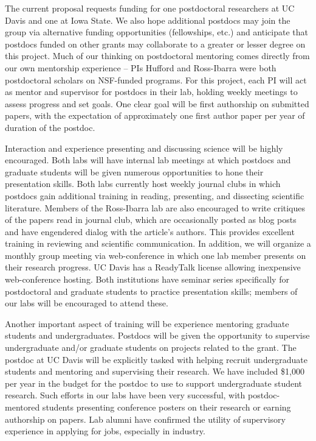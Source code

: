 The current proposal requests funding for one postdoctoral researchers at UC Davis and one at Iowa State. We also hope additional postdocs may join the group via alternative funding opportunities (fellowships, etc.) and anticipate that postdocs funded on other grants may collaborate to a greater or lesser degree on this project.  Much of our thinking on postdoctoral mentoring comes directly from our own mentorship experience -- PIs Hufford and Ross-Ibarra were both postdoctoral scholars on NSF-funded programs. For this project, each PI will act as mentor and supervisor for postdocs in their lab, holding weekly meetings to assess progress and set goals.  One clear goal will be first authorship on submitted papers, with the expectation of approximately one first author paper per year of duration of the postdoc. 

Interaction and experience presenting and discussing science will be highly encouraged. Both labs will have internal lab meetings at which postdocs and graduate students will be given numerous opportunities to hone their presentation skills.  Both labs currently host weekly journal clubs in which postdocs gain additional training in reading, presenting, and dissecting scientific literature. Members of the Ross-Ibarra lab are also encouraged to write critiques of the papers read in journal club, which are occasionally posted as blog posts and have engendered dialog with the article's authors.  This provides excellent training in reviewing and  scientific communication.  
In addition, we will organize a monthly group meeting via web-conference in which one lab member presents on their research progress.  UC Davis has a ReadyTalk license allowing inexpensive web-conference hosting. Both institutions have seminar series specifically for postdoctoral and graduate students to practice presentation skills; members of our labs will be encouraged to attend these.

Another important aspect of training will be experience mentoring graduate students and undergraduates.  Postdocs will be given the opportunity to supervise undergraduate and/or graduate students on projects related to the grant. 
The postdoc at UC Davis will be explicitly tasked with helping recruit undergraduate students and mentoring and supervising their research. We have included \$1,000 per year in the budget for the postdoc to use to support undergraduate student research.  Such efforts in our labs have been very successful, with postdoc-mentored students presenting conference posters on their research or earning authorship on papers.  Lab alumni have confirmed the utility of supervisory experience in applying for jobs, especially in industry.

